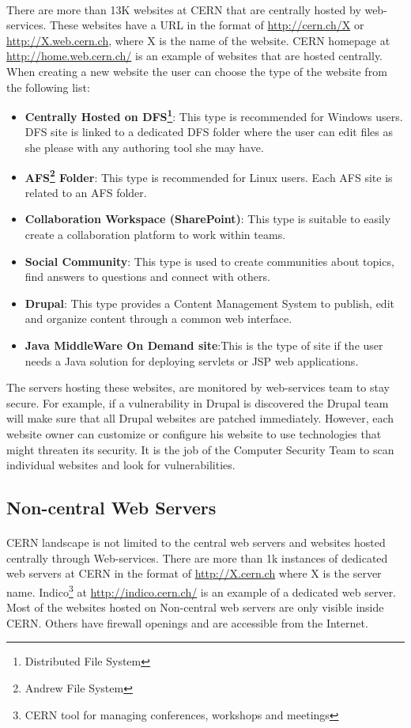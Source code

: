 \paragraph{}
There are more than 13K websites at CERN that are centrally hosted by web-services. These websites have a URL in the format of \url{http://cern.ch/X} or \url{http://X.web.cern.ch}, where X is the name of the website. CERN homepage at \url{http://home.web.cern.ch/} is an example of websites that are hosted centrally. When creating a new website the user can choose the type of the website from the following list:
\begin{itemize}
\item \textbf{Centrally Hosted on DFS\footnote{Distributed File System}}: This type is recommended for Windows users. DFS site is linked to a dedicated DFS folder where the user can edit files as she please with any authoring tool she may have.
\item \textbf{AFS\footnote{Andrew File System} Folder}: This type is recommended for Linux users. Each AFS site is related to an AFS folder.
\item \textbf{Collaboration Workspace (SharePoint)}: This type is suitable to easily create a collaboration platform to work within teams.
\item \textbf{Social Community}: This type is used to create communities about topics, find answers to questions and connect with others.
\item \textbf{Drupal}: This type provides a Content Management System to publish, edit and organize content through a common web interface.
\item \textbf{Java MiddleWare On Demand site}:This is the type of site if the user needs a Java solution for deploying servlets or JSP web applications.
\end{itemize}
The servers hosting these websites, are monitored by web-services team to stay secure. For example, if a vulnerability in Drupal is discovered the Drupal team will make sure that all Drupal websites are patched immediately. However, each website owner can customize or configure his website to use technologies that might threaten its security. It is the job of the Computer Security Team to scan individual websites and look for vulnerabilities. 
\subsection{Non-central Web Servers}
\paragraph{}
CERN landscape is not limited to the central web servers and websites hosted centrally through Web-services. There are more than 1k instances of dedicated web servers at CERN in the format of \url{http://X.cern.ch} where X is the server name. Indico\footnote{CERN tool for managing conferences, workshops and meetings} at \url{http://indico.cern.ch/} is an example of a dedicated web server. Most of the websites hosted on Non-central web servers are only visible inside CERN. Others have firewall openings and are accessible from the Internet.


